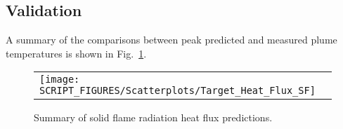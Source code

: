 \clearpage


\subsection*{Validation}

A summary of the comparisons between peak predicted and measured plume temperatures is shown in Fig.~\ref{Heat_Flux_Solid_Flame_Summary}.

\begin{figure}[!ht]
\begin{center}
\begin{tabular}{l}
\texttt{[image: SCRIPT\_FIGURES/Scatterplots/Target\_Heat\_Flux\_SF]}
\end{tabular}
\end{center}
\caption[Summary of solid flame radiation heat flux predictions]
{Summary of solid flame radiation heat flux predictions.}
\label{Heat_Flux_Solid_Flame_Summary}
\end{figure}
